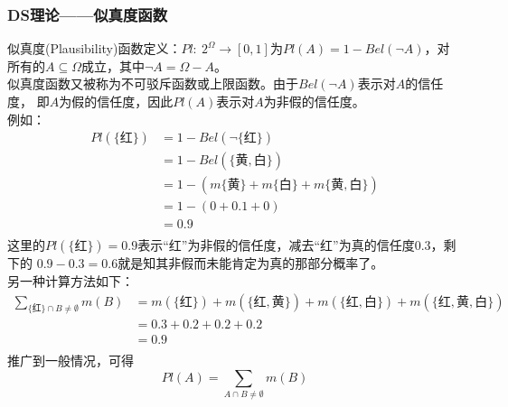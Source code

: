 \documentclass[12pt]{article}
\begin{document}
\subsubsection{DS理论——似真度函数}
似真度(Plausibility)函数定义：$Pl:\ 2^\Omega\to[0,1]$为$Pl(A)=1-Bel(\neg A)$，对
所有的$A\subseteq\Omega$成立，其中$\neg A=\Omega-A$。\\
似真度函数又被称为不可驳斥函数或上限函数。由于$Bel(\neg A)$表示对$A$的信任度，
即$A$为假的信任度，因此$Pl(A)$表示对$A$为非假的信任度。\\
例如：\\
\[
	\begin{aligned}
		Pl(\{红\})&=1-Bel(\neg \{红\})\\
		&=1-Bel(\{黄,白\})\\
		&=1-(m\{黄\}+m\{白\}+m\{黄,白\})\\
		&=1-(0+0.1+0)\\
		&=0.9\\
	\end{aligned}
\]
这里的$Pl(\{红\})=0.9$表示“红”为非假的信任度，减去“红”为真的信任度$0.3$，剩下的
$0.9-0.3=0.6$就是知其非假而未能肯定为真的那部分概率了。\\
另一种计算方法如下：\\
\[
	\begin{aligned}
		\sum\limits_{\{红\}\cap{B}\neq\emptyset}m(B)&=
		m(\{红\})+m(\{红,黄\})+m(\{红,白\})+m(\{红,黄,白\})\\
		&=0.3+0.2+0.2+0.2\\
		&=0.9\\
	\end{aligned}
\]
推广到一般情况，可得
\[
	Pl(A)=\sum\limits_{A\cap{B}\neq\emptyset}m(B)
\]
\end{document}
